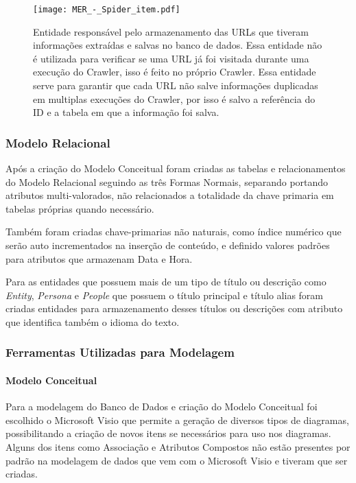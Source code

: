 \documentclass[12pt]{article}
\begin{document}
\begin{figure}[H]
\centering
\texttt{[image: MER\_-\_Spider\_item.pdf]}
\caption{Entidade responsável pelo armazenamento das URLs que tiveram informações extraídas e salvas no banco de dados. Essa entidade não é utilizada para verificar se uma URL já foi visitada durante uma execução do Crawler, isso é feito no próprio Crawler. Essa entidade serve para garantir que cada URL não salve informações duplicadas em multiplas execuções do Crawler, por isso é salvo a referência do ID e a tabela em que a informação foi salva.} \label{hash}
\end{figure}

\subsubsection{Modelo Relacional}

Após a criação do Modelo Conceitual foram criadas as tabelas e relacionamentos do Modelo Relacional seguindo as três Formas Normais, separando portando atributos multi-valorados, não relacionados a totalidade da chave primaria em tabelas próprias quando necessário.

Também foram criadas chave-primarias não naturais, como índice numérico que serão auto incrementados na inserção de conteúdo, e definido valores padrões para atributos que armazenam Data e Hora.

Para as entidades que possuem mais de um tipo de título ou descrição como \textit{Entity}, \textit{Persona} e \textit{People} que possuem o título principal e título alias foram criadas entidades para armazenamento desses títulos ou descrições com atributo que identifica também o idioma do texto.


\subsubsection{Ferramentas Utilizadas para Modelagem}

\paragraph{Modelo Conceitual\newline}

Para a modelagem do Banco de Dados e criação do Modelo Conceitual foi escolhido o Microsoft Visio que permite a geração de diversos tipos de diagramas, possibilitando a criação de novos itens se necessários para uso nos diagramas. Alguns dos itens como Associação e Atributos Compostos não estão presentes por padrão na modelagem de dados que vem com o Microsoft Visio e tiveram que ser criadas.
\end{document}
